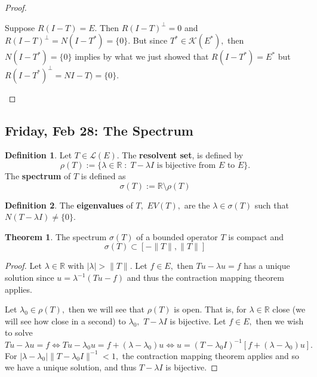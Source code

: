 \documentclass[10pt, oneside]{article}
\newcommand{\bbR}{\mathbb{R}}
\theoremstyle{definition}
\newtheorem{thm}{Theorem}
\newtheorem{defn}{Definition}
\begin{document}
\begin{proof}
\begin{enumerate}
    Suppose $R(I - T) = E.$ Then $R(I - T)^\perp = 0$ and $R(I - T)^\perp = N(I - T^*) = \{0\}.$ But since $T^* \in \mathcal{K}(E^*),$ then $N(I - T^*) = \{0\}$ implies by what we just showed that $R(I - T^*) = E^*$ but $R(I - T^*)^\perp = NI - T) = \{0\}.$
\end{enumerate}
\end{proof}


\newpage
\subsection{Friday, Feb 28: The Spectrum}
\begin{defn}
    Let $T \in \mathcal{L}(E).$ The \textbf{resolvent set}, is defined by 
    \[\rho(T) := \{\lambda \in \bbR \; : \;  T - \lambda I \text{ is bijective from $E$ to $E$}\}.\] The \textbf{spectrum} of $T$ is defined as \[\sigma(T):= \bbR \setminus \rho(T)\]
\end{defn}
\begin{defn}
    The \textbf{eigenvalues} of $T,$ $EV(T),$ are the $\lambda \in \sigma(T)$ such that $N(T - \lambda I) \neq \{0\}.$
\end{defn}

\begin{thm}
    The spectrum $\sigma(T)$ of a bounded operator $T$ is compact and 
    \[\sigma(T)\subset [-\|T\|, \|T\|]\]
\end{thm}
\begin{proof}
    Let $\lambda \in \bbR$ with $|\lambda| > \|T\|.$ Let $f\in E,$ then $Tu - \lambda u = f$ has a unique solution since $u = \lambda^{-1}(Tu -f)$ and thus the contraction mapping theorem applies.

    Let $\lambda_0 \in \rho(T),$ then we will see that $\rho(T)$ is open. That is, for $\lambda \in \bbR$ close (we will see how close in a second) to $\lambda_0,$ $T - \lambda I$ is bijective. Let $f\in E,$ then we wish to solve
    \[Tu - \lambda u = f \iff Tu - \lambda_0u = f + (\lambda - \lambda_0)u \iff u = (T - \lambda_0I)^{-1}[f + (\lambda - \lambda_0)u].\] For $|\lambda - \lambda_0|\|T - \lambda_0 I\|^{-1} < 1,$ the contraction mapping theorem applies and so we have a unique solution, and thus $T - \lambda I$ is bijective.
\end{proof}
\end{document}
